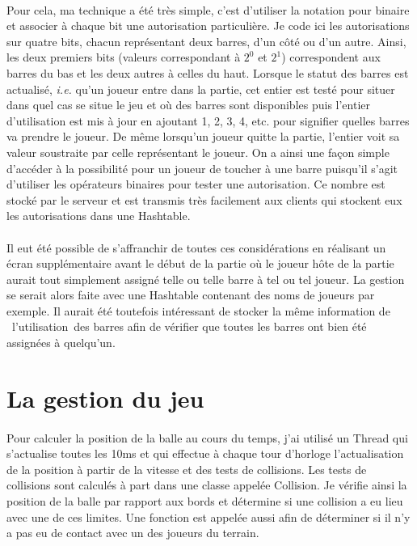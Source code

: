\documentclass[a4paper,12pt]{report}
\begin{document}
\paragraph{}
Pour cela, ma technique a été très simple, c'est d'utiliser la notation pour binaire et associer à chaque bit une autorisation particulière. Je code ici les autorisations sur quatre bits, chacun représentant deux barres, d'un côté ou d'un autre. Ainsi, les deux premiers bits (valeurs correspondant à \(2^0\) et \(2^1\)) correspondent aux barres du bas et les deux autres à celles du haut. Lorsque le statut des barres est actualisé, \emph{i.e. } qu'un joueur entre dans la partie, cet entier est testé pour situer dans quel cas se situe le jeu et où des barres sont disponibles puis l'entier d'utilisation est mis à jour en ajoutant 1, 2, 3, 4, etc. pour signifier quelles barres va prendre le joueur. De même lorsqu'un joueur quitte la partie, l'entier voit sa valeur soustraite par celle représentant le joueur. On a ainsi une façon simple d'accéder à la possibilité pour un joueur de toucher à une barre puisqu'il s'agit d'utiliser les opérateurs binaires pour tester une autorisation. Ce nombre est stocké par le serveur et est transmis très facilement aux clients qui stockent eux les autorisations dans une Hashtable.
\paragraph{}
Il eut été possible de s'affranchir de toutes ces considérations en réalisant un écran supplémentaire avant le début de la partie où le joueur hôte de la partie aurait tout simplement assigné telle ou telle barre à tel ou tel joueur. La gestion se serait alors faite avec une Hashtable contenant des noms de joueurs par exemple. Il aurait été toutefois intéressant de stocker la même information de \og l'utilisation \fg des barres afin de vérifier que toutes les barres ont bien été assignées à quelqu'un.
\section{La gestion du jeu}
\paragraph{}
Pour calculer la position de la balle au cours du temps, j'ai utilisé un Thread qui s'actualise toutes les 10ms et qui effectue à chaque tour d'horloge
l'actualisation de la position à partir de la vitesse et des tests de collisions. Les tests de collisions sont calculés à part dans une classe appelée Collision.
Je vérifie ainsi la position de la balle par rapport aux bords et détermine si une collision a eu lieu avec une de ces limites. Une fonction est appelée aussi afin de
déterminer si il n'y a pas eu de contact avec un des joueurs du terrain.
\end{document}
